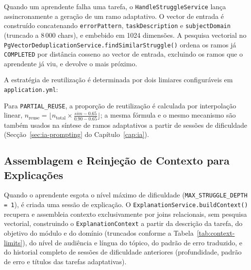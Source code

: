Quando um aprendente falha uma tarefa, o \texttt{HandleStruggleService} lança assincronamente a geração de um ramo adaptativo.
O vector de entrada é construído concatenando \texttt{errorPattern}, \texttt{taskDescription} e \texttt{subjectDomain} (truncado a 8\,000 chars), e embebido em 1024 dimensões.
A pesquisa vectorial no \texttt{PgVectorDeduplicationService.findSimilarStruggle()} ordena os ramos já \texttt{COMPLETED} por distância cosseno ao vector de entrada, excluindo os ramos que o aprendente já viu, e devolve o mais próximo.

A estratégia de reutilização é determinada por dois limiares configuráveis em \texttt{application.yml}:

\begin{table}[h!]
\centering
\caption{Estratégias de reutilização adaptativa por limiar de similaridade}
\label{tab:rag-reuse}
\end{table}

Para \texttt{PARTIAL\_REUSE}, a proporção de reutilização é calculada por interpolação linear, $n_{\text{reuse}} = \lfloor n_{\text{total}} \times \frac{sim - 0.65}{0.90 - 0.65} \rfloor$; a mesma fórmula e o mesmo mecanismo são também usados na síntese de ramos adaptativos a partir de sessões de dificuldade (Secção~\ref{sec:ia-prompting} do Capítulo~\ref{cap:ia}).

\subsection*{Assemblagem e Reinjeção de Contexto para Explicações}

Quando o aprendente esgota o nível máximo de dificuldade (\texttt{MAX\_STRUGGLE\_DEPTH = 1}), é criada uma sessão de explicação.
O \texttt{ExplanationService.buildContext()} recupera e assembleia contexto exclusivamente por joins relacionais, sem pesquisa vectorial, construindo o \texttt{ExplanationContext} a partir da descrição da tarefa, do objetivo do módulo e do domínio (truncados conforme a Tabela~\ref{tab:context-limits}), do nível de audiência e língua do tópico, do padrão de erro traduzido, e do historial completo de sessões de dificuldade anteriores (profundidade, padrão de erro e títulos das tarefas adaptativas).

